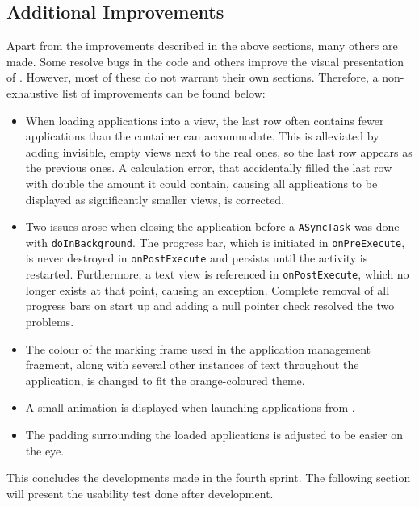 \subsection{Additional Improvements}

Apart from the improvements described in the above sections, many others are made.
Some resolve bugs in the code and others improve the visual presentation of \launcher.
However, most of these do not warrant their own sections.
Therefore, a non-exhaustive list of improvements can be found below:

\begin{itemize}
\item When loading applications into a view, the last row often contains fewer applications than the container can accommodate.
This is alleviated by adding invisible, empty views next to the real ones, so the last row appears as the previous ones.
A calculation error, that accidentally filled the last row with double the amount it could contain, causing all applications to be displayed as significantly smaller views, is corrected.
\item Two issues arose when closing the application before a \lstinline|ASyncTask| was done with \lstinline|doInBackground|.
The progress bar, which is initiated in \lstinline|onPreExecute|, is never destroyed in \lstinline|onPostExecute| and persists until the activity is restarted.
Furthermore, a text view is referenced in \lstinline|onPostExecute|, which no longer exists at that point, causing an exception.
Complete removal of all progress bars on start up and adding a null pointer check resolved the two problems.
\item The colour of the marking frame used in the application management fragment, along with several other instances of text throughout the application, is changed to fit the orange-coloured theme.
\item A small animation is displayed when launching applications from \homeactivity.
\item The padding surrounding the loaded applications is adjusted to be easier on the eye.
\end{itemize}

This concludes the developments made in the fourth sprint.
The following section will present the usability test done after development.